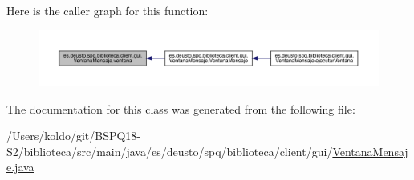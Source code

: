 Here is the caller graph for this function\+:
\nopagebreak
\begin{figure}[H]
\begin{center}
\leavevmode
\includegraphics[width=350pt]{classes_1_1deusto_1_1spq_1_1biblioteca_1_1client_1_1gui_1_1_ventana_mensaje_a6e1e53edc811caa880731fd36f304bd2_icgraph}
\end{center}
\end{figure}


The documentation for this class was generated from the following file\+:\begin{DoxyCompactItemize}
\item 
/\+Users/koldo/git/\+B\+S\+P\+Q18-\/\+S2/biblioteca/src/main/java/es/deusto/spq/biblioteca/client/gui/\mbox{\hyperlink{_ventana_mensaje_8java}{Ventana\+Mensaje.\+java}}\end{DoxyCompactItemize}
